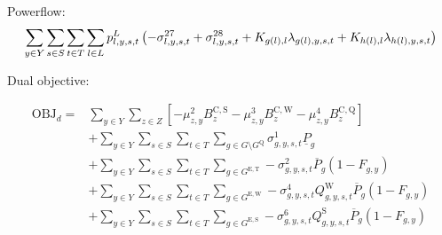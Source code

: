 \documentclass{article}
\newcommand{\sGenerators}{G}
\newcommand{\sGeneratorsExistingThermal}{G^{\mathrm{E,T}}}
\newcommand{\sGeneratorsExistingWind}{G^{\mathrm{E,W}}}
\newcommand{\sGeneratorsExistingSolar}{G^{\mathrm{E,S}}}
\newcommand{\sGeneratorsCandidateThermal}{G^{\mathrm{C,T}}}
\newcommand{\sGeneratorsCandidateWind}{G^{\mathrm{C,W}}}
\newcommand{\sStorage}{G^{\mathrm{Q}}}
\newcommand{\sYears}{Y}
\newcommand{\sScenarios}{S}
\newcommand{\sIntervals}{T}
\newcommand{\sZones}{Z}
\newcommand{\sLinks}{L}
\newcommand{\iGenerator}{g}
\newcommand{\iYear}{y}
\newcommand{\iScenario}{s}
\newcommand{\iInterval}{t}
\newcommand{\iZone}{z}
\newcommand{\iLink}{l}
\newcommand{\cPowerOutputMax}[1][\iGenerator,\iYear]{\overline{P}_{#1}}
\newcommand{\cBuildLimitWind}{B^{\mathrm{C,\mathrm{W}}}_{\iZone}}
\newcommand{\cBuildLimitSolar}{B^{\mathrm{C,\mathrm{S}}}_{\iZone}}
\newcommand{\cBuildLimitStorage}{B^{\mathrm{C,\mathrm{Q}}}_{\iZone}}
\newcommand{\cPowerOutputMin}[1][\iGenerator]{\underline{P}_{#1}}
\newcommand{\cCapacityFactorWind}[1][\iGenerator,\iYear,\iScenario,\iInterval]{Q_{#1}^{\mathrm{W}}}
\newcommand{\cCapacityFactorSolar}[1][\iGenerator,\iYear,\iScenario,\iInterval]{Q_{#1}^{\mathrm{S}}}
\newcommand{\cIncidenceMatrix}[1][\iZone,\iLink]{K_{#1}}
\newcommand{\cRetirementIndicator}[1][\iGenerator,\iYear]{F_{#1}}
\newcommand{\vPower}[1][\iGenerator,\iYear,\iScenario,\iInterval]{p_{#1}}
\newcommand{\vPowerFlow}[1][\iLink,\iYear,\iScenario,\iInterval]{p^{\sLinks}_{#1}}
\newcommand{\vInstalledCapacityTotal}[1][\iGenerator,\iYear]{a_{#1}}
\newcommand{\dSolarBuildLimit}[1][\iZone,\iYear]{\mu_{#1}^{2}}
\newcommand{\dWindBuildLimit}[1][\iZone,\iYear]{\mu_{#1}^{3}}
\newcommand{\dStorageBuildLimit}[1][\iZone,\iYear]{\mu_{#1}^{4}}
\newcommand{\dMinPowerOutput}[1][\iGenerator,\iYear,\iScenario,\iInterval]{\sigma_{#1}^{1}}
\newcommand{\dMaxPowerOutputExistingThermal}[1][\iGenerator,\iYear,\iScenario,\iInterval]{\sigma_{#1}^{2}}
\newcommand{\dMaxPowerOutputCandidateThermal}[1][\iGenerator,\iYear,\iScenario,\iInterval]{\sigma_{#1}^{3}}
\newcommand{\dMaxPowerOutputWindExisting}[1][\iGenerator,\iYear,\iScenario,\iInterval]{\sigma_{#1}^{4}}
\newcommand{\dMaxPowerOutputWindCandidate}[1][\iGenerator,\iYear,\iScenario,\iInterval]{\sigma_{#1}^{5}}
\newcommand{\dMaxPowerOutputSolarExisting}[1][\iGenerator,\iYear,\iScenario,\iInterval]{\sigma_{#1}^{6}}
\newcommand{\dMinPowerFlow}[1][\iLink,\iYear,\iScenario,\iInterval]{\sigma_{#1}^{27}}
\newcommand{\dMaxPowerFlow}[1][\iLink,\iYear,\iScenario,\iInterval]{\sigma_{#1}^{28}}
\newcommand{\dPowerBalance}[1][\iZone,\iYear,\iScenario,\iInterval]{\lambda_{#1}}
\begin{document}
Powerflow:
\begin{equation}
	\sumIntervals \sum\limits_{\iLink \in \sLinks} \vPowerFlow \left(-\dMinPowerFlow + \dMaxPowerFlow + \cIncidenceMatrix[g(\iLink), \iLink] \dPowerBalance[g(\iLink),\iYear,\iScenario,\iInterval] + \cIncidenceMatrix[h(\iLink), \iLink] \dPowerBalance[h(\iLink),\iYear,\iScenario,\iInterval]\right)
\end{equation}

Dual objective:

\begin{align}
\textrm{OBJ}_{d} =  & \sum\limits_{\iYear \in \sYears} \sum\limits_{\iZone \in \sZones} \left[- \dSolarBuildLimit \cBuildLimitSolar - \dWindBuildLimit \cBuildLimitWind - \dStorageBuildLimit \cBuildLimitStorage\right]\\
& + \sum\limits_{\iYear \in \sYears}\sum\limits_{\iScenario \in \sScenarios}\sum\limits_{\iInterval \in \sIntervals} \sum\limits_{\iGenerator \in \sGenerators \setminus \sStorage} \dMinPowerOutput \cPowerOutputMin\\
& + \sum\limits_{\iYear \in \sYears}\sum\limits_{\iScenario \in \sScenarios}\sum\limits_{\iInterval \in \sIntervals} \sum\limits_{\iGenerator \in \sGeneratorsExistingThermal} - \dMaxPowerOutputExistingThermal \cPowerOutputMax[\iGenerator] \left(1 - \cRetirementIndicator\right)\\
& + \sum\limits_{\iYear \in \sYears}\sum\limits_{\iScenario \in \sScenarios}\sum\limits_{\iInterval \in \sIntervals} \sum\limits_{\iGenerator \in \sGeneratorsExistingWind} - \dMaxPowerOutputWindExisting \cCapacityFactorWind \cPowerOutputMax[\iGenerator] \left(1 - \cRetirementIndicator\right)\\
& + \sum\limits_{\iYear \in \sYears}\sum\limits_{\iScenario \in \sScenarios}\sum\limits_{\iInterval \in \sIntervals} \sum\limits_{\iGenerator \in \sGeneratorsExistingSolar} - \dMaxPowerOutputSolarExisting \cCapacityFactorSolar \cPowerOutputMax[\iGenerator] \left(1 - \cRetirementIndicator\right)\\

\end{align}
\end{document}
